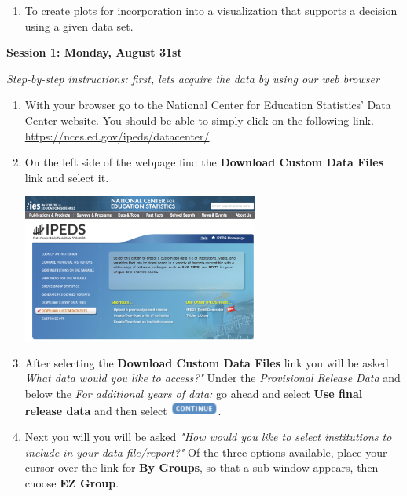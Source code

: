 \documentclass{article}
\begin{document}
{\begin{enumerate}[leftmargin=15mm]
\item To create plots for incorporation into a visualization that supports a decision using a given data set.

\end{enumerate}

\large{\textbf{Session 1: Monday, August 31st}}

\vspace{4mm}
\setlength{\leftskip}{1cm}
\textit{Step-by-step instructions: first, lets acquire the data by using our web browser}

\begin{enumerate}[leftmargin=15mm]

\item With your browser go to the National Center for Education Statistics' Data Center website.  You should be able to simply click on the following link.\\ 
\url{https://nces.ed.gov/ipeds/datacenter/}

\item On the left side of the webpage find the \textbf{Download Custom Data Files} link and select it.  
\begin{flushright}{\includegraphics[width=0.61\textwidth]{homepage.png}}\end{flushright}
 
\item After selecting the \textbf{Download Custom Data Files} link you will be asked \textit{What data would you like to access?"} Under the \textit{Provisional Release Data} and below the \textit{For additional years of data:} go ahead and select \textbf{Use final release data} and then select \includegraphics[width=0.125\textwidth]{continue.png}.

\item Next you will you will be asked \textit{"How would you like to select institutions to include in your data file/report?"}  Of the three options available, place your cursor over the link for \textbf{By Groups}, so that a sub-window appears, then choose \textbf{EZ Group}.


\end{enumerate}}
\end{document}
